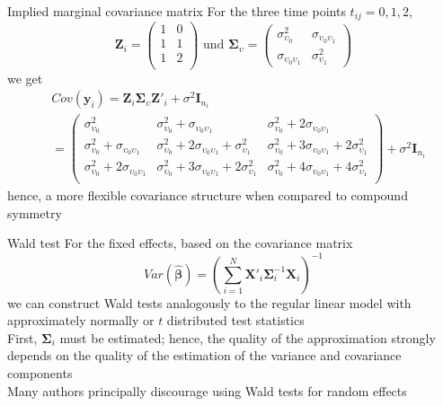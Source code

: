 \documentclass{beamer}
\newcommand{\vect}[1]{\mathbf{#1}}
\newcommand{\mat}[1]{\mathbf{#1}}
\newcommand{\gvect}[1]{\boldsymbol{#1}}
\newcommand{\gmat}[1]{\boldsymbol{#1}}
\begin{document}
\begin{frame}{Implied marginal covariance matrix}
For the three time points $t_{ij} = 0, 1, 2$,
\[
  \mat{Z}_i =
    \begin{pmatrix}
      1 & 0 \\
      1 & 1 \\
      1 & 2 \\
    \end{pmatrix}
  \text{ und }
  \gmat{\Sigma}_\upsilon =
    \begin{pmatrix}
      \sigma^2_{\upsilon_0} & \sigma_{\upsilon_0 \upsilon_1} \\
      \sigma_{\upsilon_0 \upsilon_1} & \sigma^2_{\upsilon_1}
    \end{pmatrix}
\]
we get
\begin{align*}
  & Cov(\vect{y}_i) =
    \mat{Z}_i \gmat{\Sigma}_\upsilon \mat{Z}'_i + \sigma^2 \mat{I}_{n_i} \\
  &= \begin{pmatrix}
    \sigma^2_{\upsilon_0}                                    & \sigma^2_{\upsilon_0} + \sigma_{\upsilon_0 \upsilon_1}                             & \sigma^2_{\upsilon_0} + 2 \sigma_{\upsilon_0 \upsilon_1} \\
    \sigma^2_{\upsilon_0} + \sigma_{\upsilon_0 \upsilon_1}   & \sigma^2_{\upsilon_0} + 2 \sigma_{\upsilon_0 \upsilon_1} + \sigma^2_{\upsilon_1}   & \sigma^2_{\upsilon_0} + 3 \sigma_{\upsilon_0 \upsilon_1} + 2 \sigma^2_{\upsilon_1} \\
    \sigma^2_{\upsilon_0} + 2 \sigma_{\upsilon_0 \upsilon_1} & \sigma^2_{\upsilon_0} + 3 \sigma_{\upsilon_0 \upsilon_1} + 2 \sigma^2_{\upsilon_1} & \sigma^2_{\upsilon_0} + 4 \sigma_{\upsilon_0 \upsilon_1} + 4 \sigma^2_{\upsilon_1} \\
  \end{pmatrix}
   + \sigma^2 \mat{I}_{n_i}
\end{align*}
hence, a more flexible covariance structure when compared to compound
  symmetry
\end{frame}
 
\begin{frame}{Wald test}
For the fixed effects, based on the covariance matrix
\[
  Var(\gvect{\hat\beta}) = \left( \sum_{i = 1}^N
    \mat{X}'_i \gmat{\Sigma}_i^{-1} \mat{X}_i \right)^{-1}
\]
we can construct Wald tests analogously to the regular linear model with
  approximately normally or $t$ distributed test statistics\\[2ex]

  First, $\gmat{\Sigma}_i$ must be estimated; hence, the quality of the
  approximation strongly depends on the quality of the estimation of the
  variance and covariance components\\[2ex]

  Many authors principally discourage using Wald tests for random effects
  \citep[e.\,g.,][p.~52]{HedekerGibbons06}
\end{frame}
\end{document}

